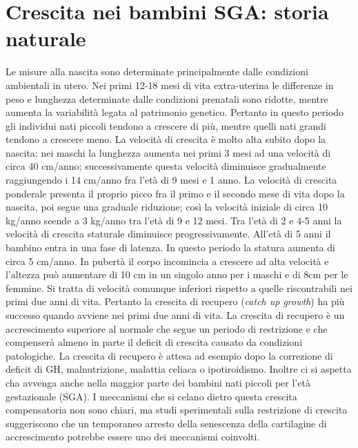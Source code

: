 \section{Crescita nei bambini SGA: storia naturale}

Le misure alla nascita sono determinate principalmente dalle condizioni ambientali in utero. Nei primi 12-18 mesi di vita extra-uterina le differenze in peso e lunghezza determinate dalle condizioni prenatali sono ridotte, mentre aumenta la variabilità legata al patrimonio genetico. Pertanto in questo periodo gli individui nati piccoli tendono a crescere di più, mentre quelli nati grandi tendono a crescere meno. La velocità di crescita è molto alta subito dopo la nascita: nei maschi la lunghezza aumenta nei primi 3 mesi ad una velocità di circa 40 cm/anno; successivamente questa velocità diminuisce gradualmente raggiungendo i 14 cm/anno fra l'età di 9 mesi e 1 anno. La velocità di crescita ponderale presenta il proprio picco fra il primo e il secondo mese di vita dopo la nascita, poi segue una graduale riduzione; così la velocità iniziale di circa 10 kg/anno scende a 3 kg/anno tra l'età di 9 e 12 mesi. Tra l'età di 2 e 4-5 anni la velocità di crescita staturale diminuisce progressivamente.%
 All'età di 5 anni il bambino entra in una fase di latenza. In questo periodo la statura aumenta di circa 5 cm/anno. In pubertà il corpo incomincia a crescere ad alta velocità e l'altezza può aumentare di 10 cm in un singolo anno per i maschi e di 8cm per le femmine. Si tratta di velocità comunque inferiori rispetto a quelle riscontrabili nei primi due anni di vita.
 Pertanto la crescita di recupero (\textit{catch up growth}) ha più successo quando avviene nei primi due anni di vita. La crescita di recupero è un accrescimento superiore al normale che segue un periodo di restrizione e che compenserà almeno in parte il deficit di crescita causato da condizioni patologiche.%
La crescita di recupero è attesa ad esempio dopo la correzione di deficit di GH, malnutrizione, malattia celiaca o ipotiroidismo. Inoltre ci si aspetta cha avvenga anche nella maggior parte dei bambini nati piccoli per l'età gestazionale (SGA). I meccanismi che si celano dietro questa crescita compensatoria non sono chiari, ma studi sperimentali sulla restrizione di crescita suggeriscono che un temporaneo arresto della senescenza della cartilagine di accrescimento potrebbe essere uno dei meccanismi 
coinvolti.\cite{gafni2001catch}
